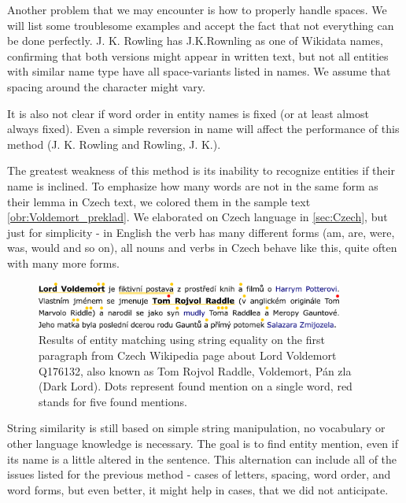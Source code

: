 Another problem that we may encounter is how to properly handle spaces. We will list some troublesome examples and accept the fact that not everything can be done perfectly. J. K. Rowling has J.K.Rownling as one of Wikidata names, confirming that both versions might appear in written text, but not all entities with similar name type have all space-variants listed in names. We assume that spacing around the \vuvozovkach{-} character might vary.

It is also not clear if word order in entity names is fixed (or at least almost always fixed). Even a simple reversion in name will affect the performance of this method (J. K. Rowling and Rowling, J. K.).

The greatest weakness of this method is its inability to recognize entities if their name is inclined. To emphasize how many words are not in the same form as their lemma in Czech text, we colored them in the sample text \autoref{obr:Voldemort_preklad}. We elaborated on Czech language in \autoref{sec:Czech}, but just for simplicity - in English the verb  has many different forms (am, are, were, was, would and so on), all nouns and verbs in Czech behave like this, quite often with many more forms.


\begin{figure}[h]

\centering
\includegraphics[width = 0.9\textwidth]{./img/Voldemort_string_equality}

\caption{Results of entity matching using string equality on the first paragraph from Czech Wikipedia page about Lord Voldemort Q176132, also known as Tom Rojvol Raddle, Voldemort, Pán zla (Dark Lord). Dots represent found mention on a single word, red stands for five found mentions. }

\end{figure}

 String similarity is still based on simple string manipulation, no vocabulary or other language knowledge is necessary. The goal is to find entity mention, even if its name is a little altered in the sentence. This alternation can include all of the issues listed for the previous method - cases of letters, spacing, word order, and word forms, but even better, it might help in cases, that we did not anticipate.

